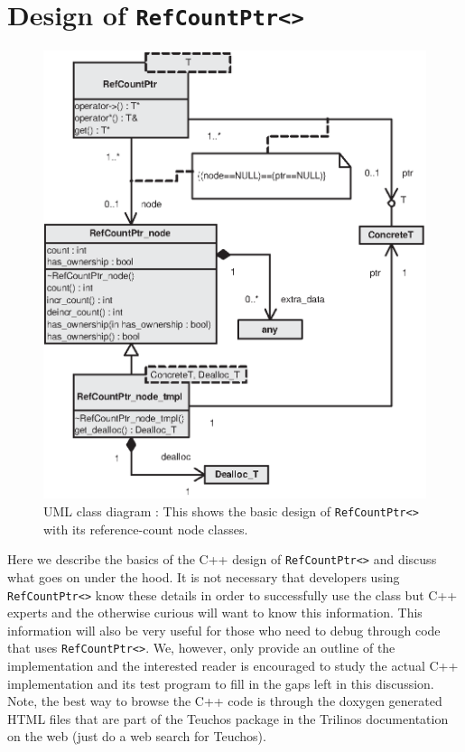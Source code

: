 %
\section{Design of \texttt{Ref\-Count\-Ptr<>}}
\label{rcp:apdx:design}
%

{\bsinglespace
\begin{figure}
\begin{center}
\includegraphics*[bb= 0.0in 0.0in 4.5in 5.3in,scale=1.0
]{RefCountPtrClassDiagram}
\end{center}
{}\caption{ {}\label{rcp:fig:rcp-class-diagram} UML class diagram :
This shows the basic design of {}\texttt{Ref\-Count\-Ptr<>} with its
reference-count node classes.  }
\end{figure}
\esinglespace}

Here we describe the basics of the C++ design of
{}\texttt{Ref\-Count\-Ptr<>} and discuss what goes on under the hood.
It is not necessary that developers using {}\texttt{Ref\-Count\-Ptr<>}
know these details in order to successfully use the class but C++
experts and the otherwise curious will want to know this information.
This information will also be very useful for those who need to debug
through code that uses {}\texttt{Ref\-Count\-Ptr<>}.  We, however,
only provide an outline of the implementation and the interested
reader is encouraged to study the actual C++ implementation and its
test program to fill in the gaps left in this discussion.  Note, the
best way to browse the C++ code is through the doxygen generated HTML
files that are part of the Teuchos package in the Trilinos
documentation on the web (just do a web search for Teuchos).

